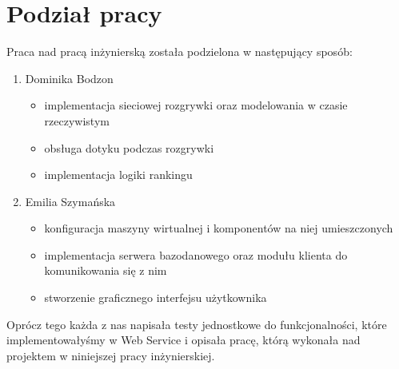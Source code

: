\section{Podział pracy}
Praca nad pracą inżynierską została podzielona w następujący sposób:
\begin{enumerate}
    \item Dominika Bodzon
    \begin{itemize}
        \item implementacja sieciowej rozgrywki oraz modelowania w czasie rzeczywistym
				\item obsługa dotyku podczas rozgrywki
        \item implementacja logiki rankingu
    \end{itemize}
    \item Emilia Szymańska
    \begin{itemize}
        \item konfiguracja maszyny wirtualnej i komponentów na niej umieszczonych
        \item implementacja serwera bazodanowego oraz modułu klienta do komunikowania się z nim
        \item stworzenie graficznego interfejsu użytkownika
    \end{itemize}
\end{enumerate}
Oprócz tego każda z nas napisała testy jednostkowe do funkcjonalności, które implementowałyśmy w Web Service i opisała pracę, którą wykonała nad projektem w niniejszej pracy inżynierskiej.